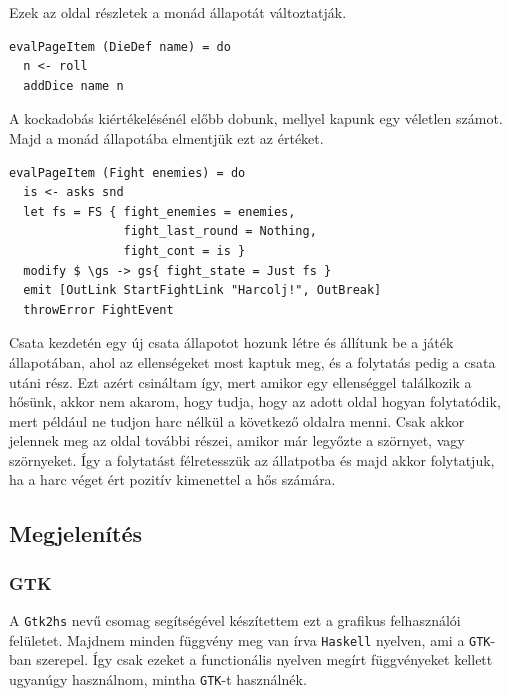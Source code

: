 \documentclass[12pt,a4paper,oneside]{report}
\newcommand{\proglang}{\texttt}
\begin{document}
  Ezek az oldal részletek a monád állapotát változtatják.
  \begin{verbatim}
evalPageItem (DieDef name) = do
  n <- roll
  addDice name n
  \end{verbatim}
  A kockadobás kiértékelésénél előbb dobunk, mellyel kapunk egy
  véletlen számot. Majd a monád állapotába elmentjük ezt az értéket.
  \begin{verbatim}
evalPageItem (Fight enemies) = do
  is <- asks snd
  let fs = FS { fight_enemies = enemies,
                fight_last_round = Nothing,
                fight_cont = is }
  modify $ \gs -> gs{ fight_state = Just fs }
  emit [OutLink StartFightLink "Harcolj!", OutBreak]
  throwError FightEvent
  \end{verbatim}
  Csata kezdetén egy új csata állapotot hozunk létre és állítunk be a
  játék állapotában, ahol az ellenségeket most kaptuk meg, és a
  folytatás pedig a csata utáni rész. Ezt azért csináltam így, mert
  amikor egy ellenséggel találkozik a hősünk, akkor nem akarom,
  hogy tudja, hogy az adott oldal hogyan folytatódik, mert például ne
  tudjon harc nélkül a következő oldalra menni. Csak akkor jelennek
  meg az oldal további részei, amikor már legyőzte a szörnyet, vagy
  szörnyeket. Így a folytatást félretesszük az állatpotba és majd
  akkor folytatjuk, ha a harc véget ért pozitív kimenettel a hős számára.
  
  \subsection{Megjelenítés}

    \subsubsection{GTK}
      A \proglang{Gtk2hs} nevű csomag segítségével készítettem ezt a grafikus
      felhasználói felületet. Majdnem minden függvény meg van írva
      \proglang{Haskell} nyelven, ami a \proglang{GTK}-ban szerepel. Így csak ezeket a
      functionális nyelven megírt függvényeket kellett ugyanúgy
      használnom, mintha \proglang{GTK}-t használnék.
\end{document}
